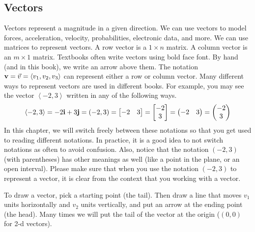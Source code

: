 \subsection{Vectors}
Vectors represent a magnitude in a given direction. We can use vectors to model forces, acceleration, velocity, probabilities, electronic data, and more. We can use matrices to represent vectors. A row vector is a {$1\times n$} matrix. A column vector is an {$m \times 1$} matrix.   Textbooks often write vectors using bold face font. By hand (and in this book), we write an arrow above them. The notation ${\bf v} = \vec v = \left<v_1,v_2,v_3\right>$ can represent either a row or column vector. Many different ways to represent vectors are used in different books.  For example, you may see the vector $\left<-2,3\right>$ written in any of the following ways.
$$\left<-2,3\right>
= -2{\bf i}+3{\bf j} 
= (-2,3) 
= \begin{bmatrix}-2&3\end{bmatrix} 
= \begin{bmatrix}-2\\3\end{bmatrix}
= \begin{pmatrix}-2&3\end{pmatrix} 
= \begin{pmatrix}-2\\3\end{pmatrix}
$$ 
In this chapter, we will switch freely between these notations so that you get used to reading different notations.  In practice, it is a good idea to not switch notations as often to avoid confusion.  Also, notice that the notation $(-2,3)$ (with parentheses) has other meanings as well (like a point in the plane, or an open interval).  Please make sure that when you use the notation $(-2,3)$ to represent a vector, it is clear from the context that you working with a vector. 

{}
To draw a vector, pick a starting point (the tail).  Then draw a line that moves $v_1$ units horizontally and $v_2$ units vertically, and put an arrow at the ending point (the head).  Many times we will put the tail of the vector at the origin ($(0,0)$ for 2-d vectors).


